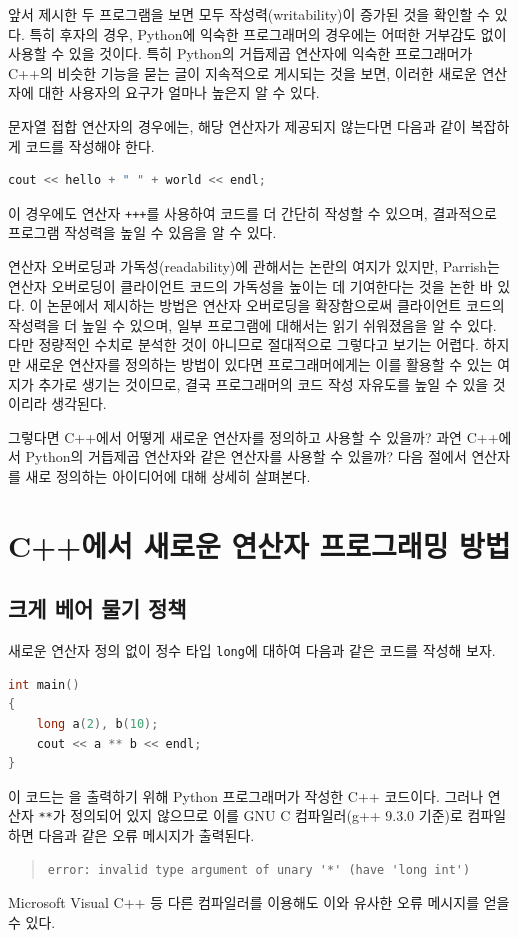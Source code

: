\documentclass[titlepage]{pnureport}
\begin{document}
앞서 제시한 두 프로그램을 보면 모두 작성력(writability)\cite{sebesta16}이 증가된 것을 확인할 수 있다. 특히 후자의 경우, Python에 익숙한 프로그래머의 경우에는 어떠한 거부감도 없이 사용할 수 있을 것이다. 특히 Python의 거듭제곱 연산자에 익숙한 프로그래머가 C++의 비슷한 기능을 묻는 글이 지속적으로 게시되는 것을 보면\cite{user13,burgess15}, 이러한 새로운 연산자에 대한 사용자의 요구가 얼마나 높은지 알 수 있다. 

문자열 접합 연산자의 경우에는, 해당 연산자가 제공되지 않는다면 다음과 같이 복잡하게 코드를 작성해야 한다.
\begin{lstlisting}[language=c++,frame=none,numbers=none]
    cout << hello + " " + world << endl;
\end{lstlisting}
이 경우에도 연산자 \texttt{+++}를 사용하여 코드를 더 간단히 작성할 수 있으며, 결과적으로 프로그램 작성력을 높일 수 있음을 알 수 있다.

연산자 오버로딩과 가독성(readability)에 관해서는 논란의 여지가 있지만, Parrish는 연산자 오버로딩이 클라이언트 코드의 가독성을 높이는 데 기여한다는 것을 논한 바 있다\cite{parrish96}. 이 논문에서 제시하는 방법은 연산자 오버로딩을 확장함으로써 클라이언트 코드의 작성력을 더 높일 수 있으며, 일부 프로그램에 대해서는 읽기 쉬워졌음을 알 수 있다. 다만 정량적인 수치로 분석한 것이 아니므로 절대적으로 그렇다고 보기는 어렵다. 하지만 새로운 연산자를 정의하는 방법이 있다면 프로그래머에게는 이를 활용할 수 있는 여지가 추가로 생기는 것이므로, 결국 프로그래머의 코드 작성 자유도를 높일 수 있을 것이리라 생각된다. 

그렇다면 C++에서 어떻게 새로운 연산자를 정의하고 사용할 수 있을까? 과연 C++에서 Python의 거듭제곱 연산자와 같은 연산자를 사용할 수 있을까? 다음 절에서 연산자를 새로 정의하는 아이디어에 대해 상세히 살펴본다.

\chapter{C++에서 새로운 연산자 프로그래밍 방법}
\label{ch:oppgm}

\section{크게 베어 물기 정책}

새로운 연산자 정의 없이 정수 타입 \texttt{long}에 대하여 다음과 같은 코드를 작성해 보자. 
\begin{lstlisting}[language=c++,numbers=none]
int main()
{
    long a(2), b(10);
    cout << a ** b << endl;
}
\end{lstlisting}
이 코드는 을 출력하기 위해 Python 프로그래머가 작성한 C++ 코드이다. 그러나 연산자 \verb|**|가 정의되어 있지 않으므로 이를 GNU C 컴파일러(g++ 9.3.0 기준)로 컴파일하면 다음과 같은 오류 메시지가 출력된다.
\begin{quote}
\begin{lstlisting}[language=text,frame=none,numbers=none]
error: invalid type argument of unary '*' (have 'long int')
\end{lstlisting}
\end{quote}
Microsoft Visual C++ 등 다른 컴파일러를 이용해도 이와 유사한 오류 메시지를 얻을 수 있다. 
\end{document}
